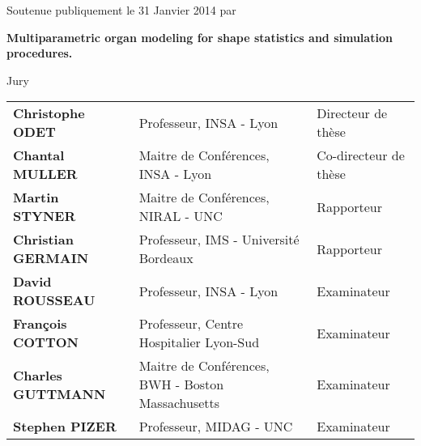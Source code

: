 \begin{changemargin}{-1.7cm}{0 cm}
\begin{center}
{Soutenue publiquement le 31 Janvier 2014 par}

\vspace{0.25cm}

{\Large \authorname}

\vspace{0.25cm}

\Huge \bf Multiparametric organ modeling for shape statistics and simulation procedures.

\vspace{0.3cm}
\end{center}


\begin{center}
{\Large Jury} \\
\vspace{0.5cm}
\begin{tabular}{lll}
    {\bf Christophe ODET} & Professeur, INSA - Lyon & Directeur de th\`{e}se \\
    {\bf Chantal MULLER} & Maitre de Conf\'{e}rences, INSA - Lyon & Co-directeur de th\`{e}se \\
    {\bf Martin STYNER}   & Maitre de Conf\'{e}rences, NIRAL - UNC & Rapporteur \\
    {\bf Christian GERMAIN} & Professeur,  IMS - Universit\'{e} Bordeaux & Rapporteur \\
    {\bf David ROUSSEAU}   & Professeur,  INSA - Lyon & Examinateur \\
    {\bf Fran\c{c}ois COTTON} & Professeur, Centre Hospitalier Lyon-Sud & Examinateur \\
    {\bf Charles GUTTMANN}   & Maitre de Conf\'{e}rences, BWH - Boston Massachusetts & Examinateur \\
    {\bf Stephen PIZER}   & Professeur, MIDAG - UNC & Examinateur \\
\end{tabular}
\end{center}

\end{changemargin}

